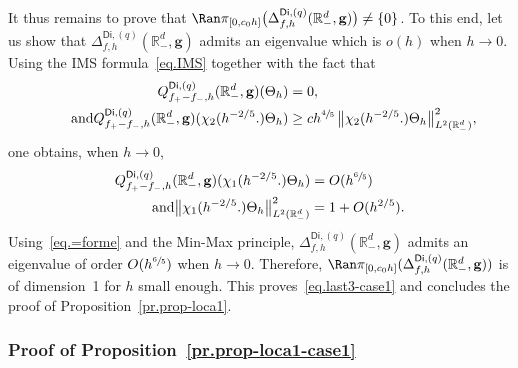 \documentclass[10pt]{amsart}
\newcommand{\mbf}[1]{\mathbf{#1}}
\theoremstyle{plain}
\theoremstyle{definition}
\begin{document}
It thus remains to prove that $\Ran \pi _{[0,c_0h]}\bigl(\Delta_{f,h}^{\mathsf{Di},(q)}(\mathbb R_-^d, \mbf g) \bigr) \neq \{0\}$. To this end, let us show that $\Delta_{f,h}^{\mathsf{Di},(q)}(\mathbb R_-^d, \mbf g)$ admits an eigenvalue which is $o(h)$ when $h\to 0$. Using the IMS formula~\eqref{eq.IMS} together with the fact that
\begin{align*}
Q_{f_+-f_-,h}^{\mathsf{Di},(q)}(\mathbb R_-^d, { \mbf g}) (\Theta_h)&=0,
\\
\tag*{and}
Q_{f_+-f_-,h}^{\mathsf{Di},(q)}(\mathbb R_-^d, { \mbf g}) (\chi_2(h^{-2/5 }.) \Theta_h) &\ge ch^{\sfrac 45}\, \big\Vert \chi_2(h^{-2/5 }.) \Theta_h\big\Vert_{L^2(\mathbb R_-^d)}^2,
\end{align*}
one obtains, when $h\to 0$,
\begin{align*}
Q_{f_+-f_-,h}^{\mathsf{Di},(q)}(\mathbb R_-^d, { \mbf g}) (\chi_1(h^{-2/5 }.) \Theta_h)&=O(h^{\sfrac 65})
\\
\tag*{and}
\big\Vert \chi_1(h^{-2/5 }.) \Theta_h\big\Vert_{L^2(\mathbb R_-^d)}^2&=1+O(h^{2/5 }).
\end{align*}
Using~\eqref{eq.=forme} and the Min-Max principle, $\Delta_{f,h}^{\mathsf{Di},(q)}(\mathbb R_-^d, \mbf g)$ admits an eigenvalue of order $O(h^{\sfrac 65})$ when $h\to 0$.
Therefore, $\Ran \pi_{[0,c_0h]}
(\Delta_{f,h}^{\mathsf{Di},(q)}(\mathbb R_-^d, \mbf g))$ is of
dimension~1 for $h$ small enough.
This proves~\eqref{eq.last3-case1} and concludes the proof of Proposition~\ref{pr.prop-loca1}.

\subsubsection{Proof of Proposition~\ref{pr.prop-loca1-case1}}\label{sec.prop-loca1-case1}
\end{document}
